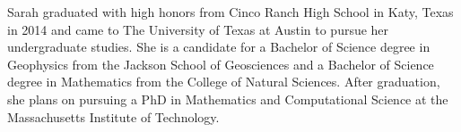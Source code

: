 Sarah graduated with high honors from Cinco Ranch High School in Katy, Texas in 2014 and came to The University of Texas at Austin to pursue her undergraduate studies. 
She is a candidate for a Bachelor of Science degree in Geophysics from the Jackson School of Geosciences and a Bachelor of Science degree in Mathematics from the College of Natural Sciences. 
After graduation, she plans on pursuing a PhD in Mathematics and Computational Science at the Massachusetts Institute of Technology.

